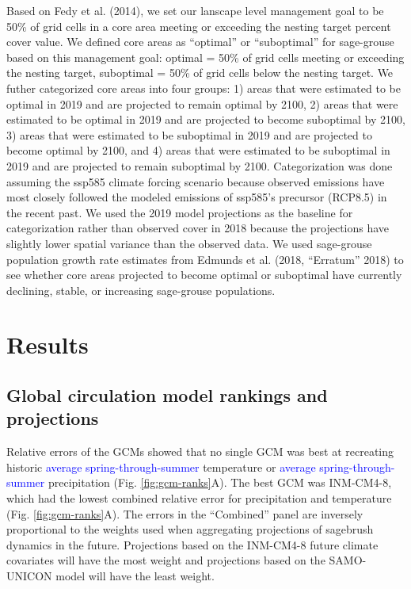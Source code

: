 \documentclass[
  12pt,
]{article}
\begin{document}
Based on Fedy et al. (2014), we set our lanscape level management goal to be 50\% of grid cells in a core area meeting or exceeding the nesting target percent cover value.
We defined core areas as ``optimal'' or ``suboptimal'' for sage-grouse based on this management goal: optimal = 50\% of grid cells meeting or exceeding the nesting target, suboptimal = 50\% of grid cells below the nesting target.
We futher categorized core areas into four groups: 1) areas that were estimated to be optimal in 2019 and are projected to remain optimal by 2100, 2) areas that were estimated to be optimal in 2019 and are projected to become suboptimal by 2100, 3) areas that were estimated to be suboptimal in 2019 and are projected to become optimal by 2100, and 4) areas that were estimated to be suboptimal in 2019 and are projected to remain suboptimal by 2100.
Categorization was done assuming the ssp585 climate forcing scenario because observed emissions have most closely followed the modeled emissions of ssp585's precursor (RCP8.5) in the recent past.
We used the 2019 model projections as the baseline for categorization rather than observed cover in 2018 because the projections have slightly lower spatial variance than the observed data.
We used sage-grouse population growth rate estimates from Edmunds et al. (2018, {``Erratum''} 2018) to see whether core areas projected to become optimal or suboptimal have currently declining, stable, or increasing sage-grouse populations.

\hypertarget{results}{%
\section{Results}\label{results}}

\hypertarget{global-circulation-model-rankings-and-projections}{%
\subsection{Global circulation model rankings and projections}\label{global-circulation-model-rankings-and-projections}}

Relative errors of the GCMs showed that no single GCM was best at recreating historic \textcolor{blue}{average spring-through-summer} temperature or \textcolor{blue}{average spring-through-summer} precipitation (Fig. \ref{fig:gcm-ranks}A).
The best GCM was INM-CM4-8, which had the lowest combined relative error for precipitation and temperature (Fig. \ref{fig:gcm-ranks}A).
The errors in the ``Combined'' panel are inversely proportional to the weights used when aggregating projections of sagebrush dynamics in the future.
Projections based on the INM-CM4-8 future climate covariates will have the most weight and projections based on the SAMO-UNICON model will have the least weight.
\end{document}
